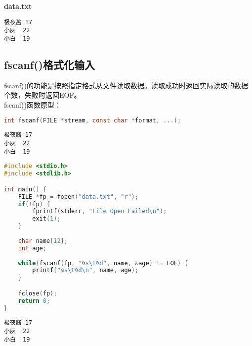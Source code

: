 \begin{tcolorbox}
	\textbf{data.txt}
	\begin{verbatim}
极夜酱	17
小灰	22
小白	19
	\end{verbatim}
\end{tcolorbox}

\vspace{0.5cm}

\subsection{fscanf()格式化输入}

fscanf()的功能是按照指定格式从文件读取数据。读取成功时返回实际读取的数据个数，失败时返回EOF。\\

fscanf()函数原型：

\vspace{-0.5cm}

\begin{lstlisting}[language=C]
int fscanf(FILE *stream, const char *format, ...);
\end{lstlisting}

\vspace{0.5cm}


\begin{lstlisting}[title=data.txt]
极夜酱	17
小灰	22
小白	19
\end{lstlisting}

\begin{lstlisting}[language=C, title=fscanf.c]
#include <stdio.h>
#include <stdlib.h>

int main() {
    FILE *fp = fopen("data.txt", "r");
    if(!fp) {
        fprintf(stderr, "File Open Failed\n");
        exit(1);
    }
    
    char name[12];
    int age;
    
    while(fscanf(fp, "%s\t%d", name, &age) != EOF) {
        printf("%s\t%d\n", name, age);
    }

    fclose(fp);
    return 0;
}
\end{lstlisting}

\begin{tcolorbox}
	\begin{verbatim}
极夜酱	17
小灰	22
小白	19
	\end{verbatim}
\end{tcolorbox}

\vspace{0.5cm}

